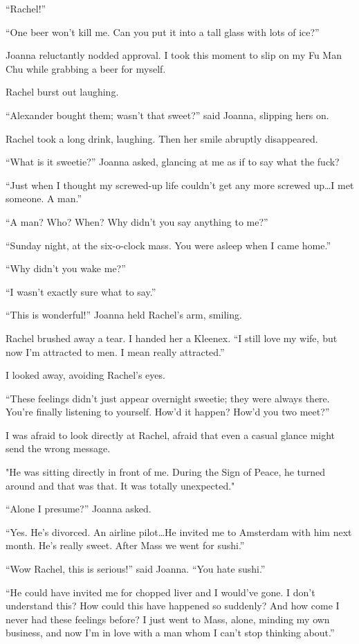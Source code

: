 ``Rachel!''

``One beer won't kill me. Can you put it into a tall glass with lots of
ice?''

Joanna reluctantly nodded approval. I took this moment to slip on my Fu
Man Chu while grabbing a beer for myself.

Rachel burst out laughing.

``Alexander bought them; wasn't that sweet?'' said Joanna, slipping hers
on.

Rachel took a long drink, laughing. Then her smile abruptly disappeared.

``What is it sweetie?'' Joanna asked, glancing at me as if to say what
the fuck?

``Just when I thought my screwed-up life couldn't get any more screwed
up\ldots I met someone. A man.''

``A man? Who? When? Why didn't you say anything to me?''

``Sunday night, at the six-o-clock mass. You were asleep when I came
home.''

``Why didn't you wake me?''

``I wasn't exactly sure what to say.''

``This is wonderful!'' Joanna held Rachel's arm, smiling.

Rachel brushed away a tear. I handed her a Kleenex. ``I still love my
wife, but now I'm attracted to men. I mean really attracted.''

I looked away, avoiding Rachel's eyes.

``These feelings didn't just appear overnight sweetie; they were always
there. You're finally listening to yourself. How'd it happen? How'd you
two meet?''

I was afraid to look directly at Rachel, afraid that even a casual
glance might send the wrong message.

"He was sitting directly in front of me. During the Sign of Peace, he
turned around and that was that. It was totally unexpected."

``Alone I presume?'' Joanna asked.

``Yes. He's divorced. An airline pilot\ldots He invited me to Amsterdam
with him next month. He's really sweet. After Mass we went for sushi.''

``Wow Rachel, this is serious!'' said Joanna. ``You hate sushi.''

``He could have invited me for chopped liver and I would've gone. I
don't understand this? How could this have happened so suddenly? And how
come I never had these feelings before? I just went to Mass, alone,
minding my own business, and now I'm in love with a man whom I can't
stop thinking about.''

